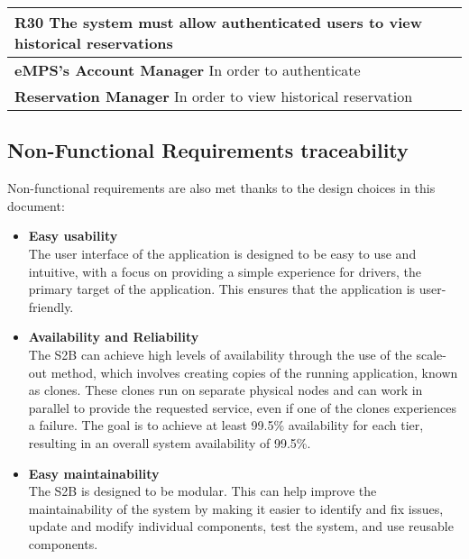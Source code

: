 \begin{table}[H]
    \begin{tabularx}{\textwidth}{X}
        \toprule
        \textbf{R30} The system must allow authenticated users to view historical reservations \\ \midrule
        \textbf{eMPS's Account Manager} In order to authenticate                               \\
        \textbf{Reservation Manager} In order to view historical reservation                   \\
    \end{tabularx}
\end{table}

\subsection*{Non-Functional Requirements traceability}
Non-functional requirements are also met thanks to the design choices in this document:
\begin{itemize}
\item \textbf{Easy usability}\\
The user interface of the application is designed to be easy to use and intuitive, with a focus on providing a simple experience for drivers, the primary target of the application. This ensures that the application is user-friendly.
\item \textbf{Availability and Reliability}\\
The S2B can achieve high levels of availability through the use of the scale-out method, which involves creating copies of the running application, known as clones. These clones run on separate physical nodes and can work in parallel to provide the requested service, even if one of the clones experiences a failure. The goal is to achieve at least 99.5\% availability for each tier, resulting in an overall system availability of 99.5\%.
\item \textbf{Easy maintainability}\\
The S2B is designed to be modular. This can help improve the maintainability of the system by making it easier to identify and fix issues, update and modify individual components, test the system, and use reusable components.
\end{itemize}

